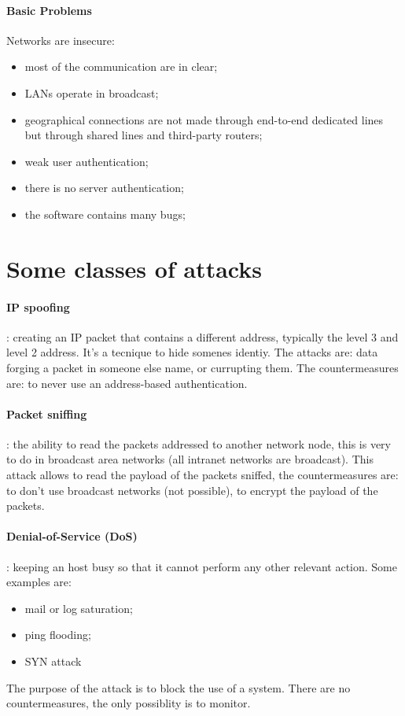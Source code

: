 \documentclass[12pt]{article}
\begin{document}
\paragraph{Basic Problems}
Networks are insecure:
\begin{itemize}
    \item most of the communication are in clear;
    \item LANs operate in broadcast;
    \item geographical connections are not made through end-to-end dedicated lines but through shared lines and third-party routers;
    \item weak user authentication;
    \item there is no server authentication;
    \item the software contains many bugs;
\end{itemize}

\section{Some classes of attacks}
\paragraph{IP spoofing}: creating an IP packet that contains a different address, typically the level 3 and level 2 address. It's a tecnique to hide somenes identiy. The attacks are: data forging a packet in someone else name, or currupting them. The countermeasures are: to never use an address-based authentication.

\paragraph{Packet sniffing}: the ability to read the packets addressed to another network node, this is very to do in broadcast area networks (all intranet networks are broadcast). This attack allows to read the payload of the packets sniffed, the countermeasures are: to don't use broadcast networks (not possible), to encrypt the payload of the packets.

\paragraph{Denial-of-Service (DoS)}: keeping an host busy so that it cannot perform any other relevant action. Some examples are:
\begin{itemize}
    \item mail or log saturation;
    \item ping flooding;
    \item SYN attack
\end{itemize}
The purpose of the attack is to block the use of a system. There are no countermeasures, the only possiblity is to monitor.
\end{document}

